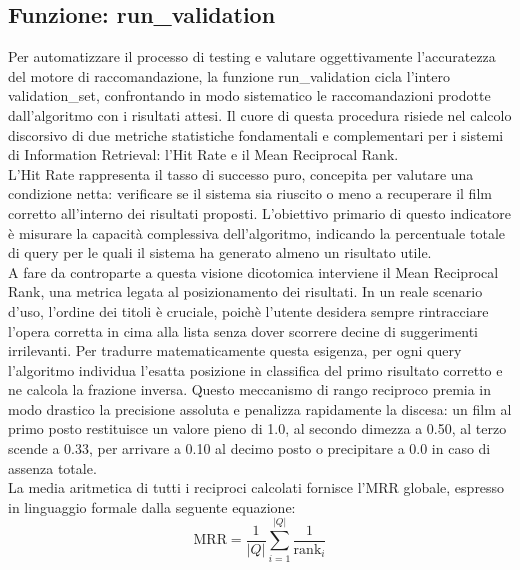 \documentclass{article}
\begin{document}
\subsection{Funzione: run\_validation}
Per automatizzare il processo di testing e valutare oggettivamente l'accuratezza del motore di raccomandazione, la funzione run\_validation cicla l'intero validation\_set, confrontando in modo sistematico le raccomandazioni prodotte dall'algoritmo con i risultati attesi. Il cuore di questa procedura risiede nel calcolo discorsivo di due metriche statistiche fondamentali e complementari per i sistemi di Information Retrieval: l'Hit Rate e il Mean Reciprocal Rank.\\
L'Hit Rate rappresenta il tasso di successo puro, concepita per valutare una condizione netta: verificare se il sistema sia riuscito o meno a recuperare il film corretto all'interno dei risultati proposti. L'obiettivo primario di questo indicatore \`e misurare la capacit\`a complessiva dell'algoritmo, indicando la percentuale totale di query per le quali il sistema ha generato almeno un risultato utile.\\
A fare da controparte a questa visione dicotomica interviene il Mean Reciprocal Rank, una metrica legata al posizionamento dei risultati. In un reale scenario d'uso, l'ordine dei titoli \`e cruciale, poich\`e l'utente desidera sempre rintracciare l'opera corretta in cima alla lista senza dover scorrere decine di suggerimenti irrilevanti. Per tradurre matematicamente questa esigenza, per ogni query l'algoritmo individua l'esatta posizione in classifica del primo risultato corretto e ne calcola la frazione inversa. Questo meccanismo di rango reciproco premia in modo drastico la precisione assoluta e penalizza rapidamente la discesa: un film al primo posto restituisce un valore pieno di 1.0, al secondo dimezza a 0.50, al terzo scende a 0.33, per arrivare a 0.10 al decimo posto o precipitare a 0.0 in caso di assenza totale.\\
La media aritmetica di tutti i reciproci calcolati fornisce l'MRR globale, espresso in linguaggio formale dalla seguente equazione:
\begin{equation}
	\text{MRR} = \frac{1}{|Q|} \sum_{i=1}^{|Q|} \frac{1}{\text{rank}_i}
\end{equation}
\end{document}
